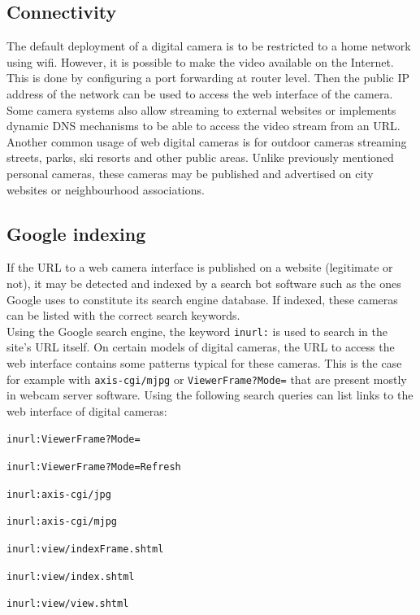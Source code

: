 \subsection{Connectivity}
\label{sec:cam-connect}

The default deployment of a digital camera is to be restricted to a home network using wifi.
However, it is possible to make the video available on the Internet.
This is done by configuring a port forwarding at router level.
Then the public IP address of the network can be used to access the web interface of the camera.
Some camera systems also allow streaming to external websites or implements dynamic DNS mechanisms to be able to access the video stream from an URL.\\

Another common usage of web digital cameras is for outdoor cameras streaming streets, parks, ski resorts and other public areas.
Unlike previously mentioned personal cameras, these cameras may be published and advertised on city websites or neighbourhood associations.

\subsection{Google indexing}

If the URL to a web camera interface is published on a website (legitimate or not), it may be detected and indexed by a search bot software such as the ones Google uses to constitute its search engine database.
If indexed, these cameras can be listed with the correct search keywords.\\

Using the Google search engine, the keyword \texttt{inurl:} is used to search in the site's URL itself.
On certain models of digital cameras, the URL to access the web interface contains some patterns typical for these cameras.
This is the case for example with \texttt{axis-cgi/mjpg} or \texttt{ViewerFrame?Mode=} that are present mostly in webcam server software.
Using the following search queries can list links to the web interface of digital cameras:

\begin{itemizealt}
\item \texttt{inurl:ViewerFrame?Mode=}
\item \texttt{inurl:ViewerFrame?Mode=Refresh}
\item \texttt{inurl:axis-cgi/jpg}
\item \texttt{inurl:axis-cgi/mjpg}
\item \texttt{inurl:view/indexFrame.shtml}
\item \texttt{inurl:view/index.shtml}
\item \texttt{inurl:view/view.shtml}
\end{itemizealt}


